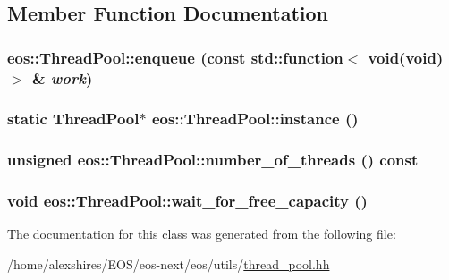 \subsection{Member Function Documentation}
\hypertarget{classeos_1_1ThreadPool_aa53eba2596379e9a258930324817a0df}{
\subsubsection[{enqueue}]{ eos::ThreadPool::enqueue (const std::function$<$ void(void)$>$ \& {\em work})}}
\label{classeos_1_1ThreadPool_aa53eba2596379e9a258930324817a0df}
\hypertarget{classeos_1_1ThreadPool_afcdf38abab1caae94bc6e90b5b5d69bf}{
\subsubsection[{instance}]{\setlength{\rightskip}{0pt plus 5cm}static {\bf ThreadPool}$\ast$ eos::ThreadPool::instance ()}}
\label{classeos_1_1ThreadPool_afcdf38abab1caae94bc6e90b5b5d69bf}
\hypertarget{classeos_1_1ThreadPool_ad077ff091504b8e6d73fca55ef41baae}{
\subsubsection[{number\_\-of\_\-threads}]{\setlength{\rightskip}{0pt plus 5cm}unsigned eos::ThreadPool::number\_\-of\_\-threads () const}}
\label{classeos_1_1ThreadPool_ad077ff091504b8e6d73fca55ef41baae}
\hypertarget{classeos_1_1ThreadPool_ae5dee2f59b31e15db165313a32c89885}{
\subsubsection[{wait\_\-for\_\-free\_\-capacity}]{\setlength{\rightskip}{0pt plus 5cm}void eos::ThreadPool::wait\_\-for\_\-free\_\-capacity ()}}
\label{classeos_1_1ThreadPool_ae5dee2f59b31e15db165313a32c89885}


The documentation for this class was generated from the following file:\begin{DoxyCompactItemize}
\item 
/home/alexshires/EOS/eos-\/next/eos/utils/\hyperlink{thread__pool_8hh}{thread\_\-pool.hh}\end{DoxyCompactItemize}
